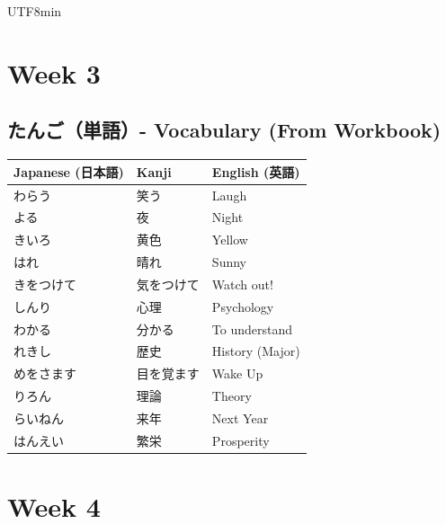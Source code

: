 \documentclass[11pt]{article}
\begin{document}
\begin{CJK}{UTF8}{min}

\newpage
\section{Week 3}

\subsection{たんご（単語）- Vocabulary (From Workbook)}
\begin{tabularx}{\linewidth}{X | X | X}
    \toprule
    \textbf{Japanese (日本語)} & \textbf{Kanji} & \textbf{English (英語)} \\
    \midrule
    わらう & 笑う & Laugh \\
    よる & 夜 & Night \\
    きいろ & 黄色 & Yellow \\
    はれ & 晴れ & Sunny \\
    きをつけて & 気をつけて & Watch out! \\
    しんり & 心理 & Psychology \\
    わかる & 分かる & To understand \\
    れきし & 歴史 & History (Major) \\
    めをさます & 目を覚ます & Wake Up \\
    りろん & 理論 & Theory \\
    らいねん & 来年 & Next Year \\
    はんえい & 繁栄 & Prosperity \\
    \bottomrule
\end{tabularx}


\newpage
\section{Week 4}


\end{CJK}
\end{document}
